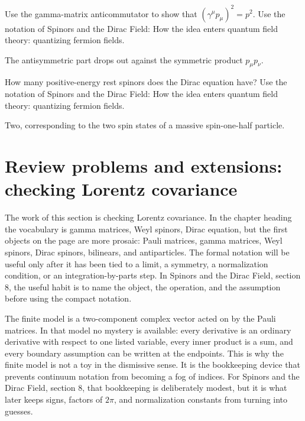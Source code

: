 \begin{exercise}
Use the gamma-matrix anticommutator to show that \((\gamma^\mu p_\mu)^2=p^2\).  Use the notation of Spinors and the Dirac Field: How the idea enters quantum field theory: quantizing fermion fields.
\begin{answer}
The antisymmetric part drops out against the symmetric product \(p_\mu p_\nu\).
\end{answer}
\end{exercise}

\begin{exercise}
How many positive-energy rest spinors does the Dirac equation have?  Use the notation of Spinors and the Dirac Field: How the idea enters quantum field theory: quantizing fermion fields.
\begin{answer}
Two, corresponding to the two spin states of a massive spin-one-half particle.
\end{answer}
\end{exercise}



\section{Review problems and extensions: checking Lorentz covariance}

The work of this section is checking Lorentz covariance.  In the chapter heading the vocabulary is gamma matrices, Weyl spinors, Dirac equation, but the first objects on the page are more prosaic: Pauli matrices, gamma matrices, Weyl spinors, Dirac spinors, bilinears, and antiparticles.  The formal notation will be useful only after it has been tied to a limit, a symmetry, a normalization condition, or an integration-by-parts step.  In Spinors and the Dirac Field, section 8, the useful habit is to name the object, the operation, and the assumption before using the compact notation.

The finite model is a two-component complex vector acted on by the Pauli matrices.  In that model no mystery is available: every derivative is an ordinary derivative with respect to one listed variable, every inner product is a sum, and every boundary assumption can be written at the endpoints.  This is why the finite model is not a toy in the dismissive sense.  It is the bookkeeping device that prevents continuum notation from becoming a fog of indices.  For Spinors and the Dirac Field, section 8, that bookkeeping is deliberately modest, but it is what later keeps signs, factors of \(2\pi\), and normalization constants from turning into guesses.

